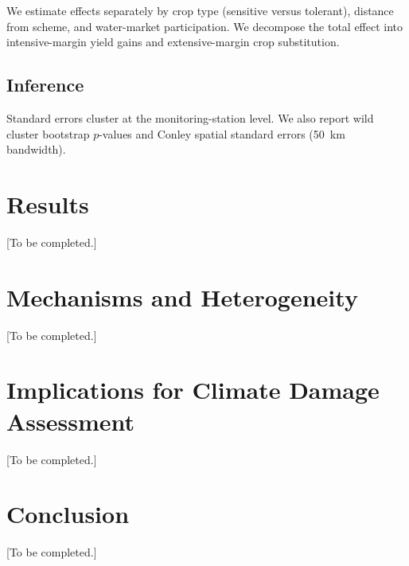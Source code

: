 \documentclass[12pt]{article}
\begin{document}
We estimate effects separately by crop type (sensitive versus tolerant), distance from scheme, and water-market participation. We decompose the total effect into intensive-margin yield gains and extensive-margin crop substitution.

\subsection{Inference}

Standard errors cluster at the monitoring-station level. We also report wild cluster bootstrap $p$-values and Conley spatial standard errors (50~km bandwidth).



\section{Results}\label{sec:results}
[To be completed.]

\section{Mechanisms and Heterogeneity}\label{sec:mechanisms}
[To be completed.]

\section{Implications for Climate Damage Assessment}\label{sec:implications}
[To be completed.]

\section{Conclusion}\label{sec:conclusion}
[To be completed.]


\newpage

\end{document}
